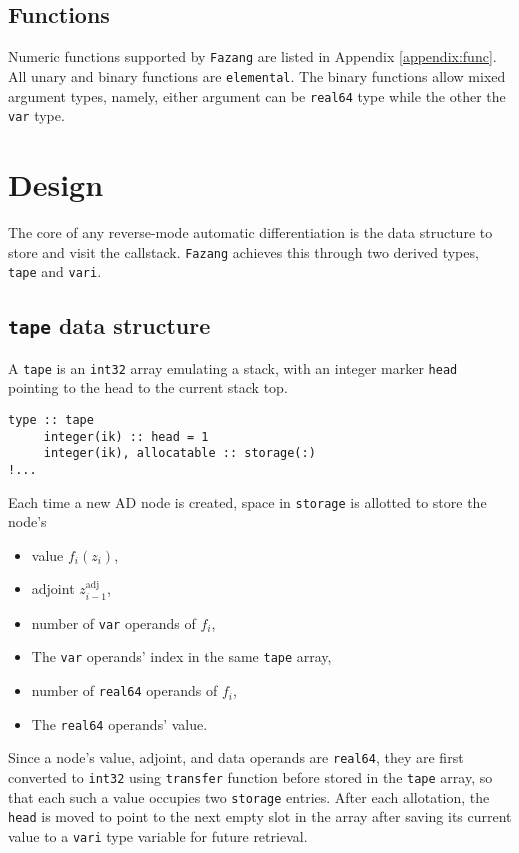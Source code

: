 \documentclass[12pt, reqno, oneside]{amsbook}
\begin{document}
\section{Functions}
\label{sec:orgc81a8cc}
Numeric functions supported by \texttt{Fazang} are listed in Appendix \ref{appendix:func}. All unary and
binary functions are \texttt{elemental}. The binary functions allow mixed
argument types, namely, either argument can be \texttt{real64} type while the
other the \texttt{var} type.

\chapter{Design}
\label{sec:orgd65362a}
The core of any reverse-mode automatic differentiation is the data
structure to store and visit the callstack. \texttt{Fazang} achieves this
through two derived types, \texttt{tape} and \texttt{vari}.

\section{\texttt{tape} data structure}
\label{sec:orgb5eb027}
A \texttt{tape} is an \texttt{int32} array emulating a stack, with an integer marker \texttt{head} pointing to the
head to the current stack top.
\begin{verbatim}
type :: tape
     integer(ik) :: head = 1
     integer(ik), allocatable :: storage(:)
!...
\end{verbatim}
Each time a new AD node is created,
space in \texttt{storage} is allotted to store the node's
\begin{itemize}
\item value \(f_i(z_i)\),
\item adjoint \(z_{i-1}^{\text{adj}}\),
\item number of \texttt{var} operands of \(f_i\),
\item The \texttt{var} operands' index in the same \texttt{tape} array,
\item number of \texttt{real64} operands of \(f_i\),
\item The \texttt{real64} operands' value.
\end{itemize}

Since a node's value, adjoint, and data
operands are \texttt{real64}, they are first converted to \texttt{int32} using
\texttt{transfer} function before stored in the \texttt{tape} array, so that each such
a value occupies two \texttt{storage} entries. After each
allotation, the \texttt{head} is moved to point to the next empty slot in
the array after saving its current value to a \texttt{vari} type variable
for future retrieval.
\end{document}
